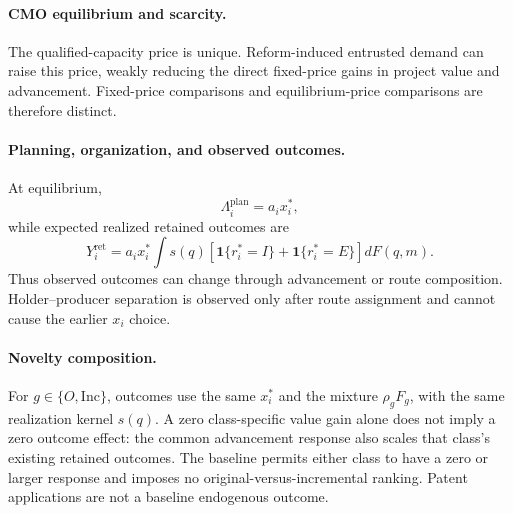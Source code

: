 \documentclass[11pt]{article}
\begin{document}
\paragraph{CMO equilibrium and scarcity.}
The qualified-capacity price is unique. Reform-induced entrusted demand can
raise this price, weakly reducing the direct fixed-price gains in project
value and advancement. Fixed-price comparisons and equilibrium-price
comparisons are therefore distinct.

\paragraph{Planning, organization, and observed outcomes.}
At equilibrium,
\[
  \Lambda_i^{\mathrm{plan}}=a_ix_i^*,
\]
while expected realized retained outcomes are
\begin{equation}
  Y_i^{\mathrm{ret}}
  =
  a_ix_i^*
  \int s(q)
  \left[
  \mathbf 1\{r_i^*=I\}
  +
  \mathbf 1\{r_i^*=E\}
  \right]dF(q,m).
  \label{eq:p16m-retained-outcome}
\end{equation}
Thus observed outcomes can change through advancement or route composition.
Holder--producer separation is observed only after route assignment and
cannot cause the earlier \(x_i\) choice.

\paragraph{Novelty composition.}
For \(g\in\{O,\mathrm{Inc}\}\), outcomes use the same \(x_i^*\) and the
mixture \(\rho_gF_g\), with the same realization kernel \(s(q)\).
A zero class-specific value gain alone does not imply a zero outcome effect:
the common advancement response also scales that class's existing retained
outcomes. The baseline permits either class to have a zero or
larger response and imposes no original-versus-incremental ranking. Patent
applications are not a baseline endogenous outcome.
\end{document}
